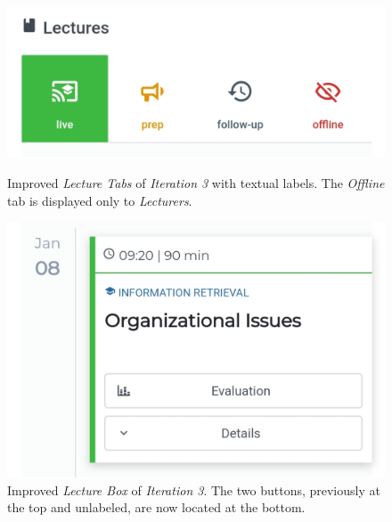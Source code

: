 \begin{figure}
	\centering
	\begin{minipage}[t]{.5\textwidth}
		\centering
		\includegraphics[width=0.95\linewidth]{screenshots/redesign/lecture_tab_labels.jpg}
		\captionsetup{width=.8\linewidth}
		\caption{Improved \emph{Lecture Tabs} of \emph{Iteration 3} with textual labels. The \emph{Offline} tab is displayed only to \emph{Lecturers}.}
		\label{fig:main_view_tab_labels}
	\end{minipage}%
	\begin{minipage}[t]{.5\textwidth}
		\centering
		\includegraphics[width=0.95\linewidth]{screenshots/redesign/main_view_it3_lecture_box.jpg}
		\captionsetup{width=.8\linewidth}
		\caption{Improved \emph{Lecture Box} of \emph{Iteration 3}. The two buttons, previously at the top and unlabeled, are now located at the bottom.}
		\label{fig:main_view_lecture_box_buttons}
	\end{minipage}
\end{figure}
